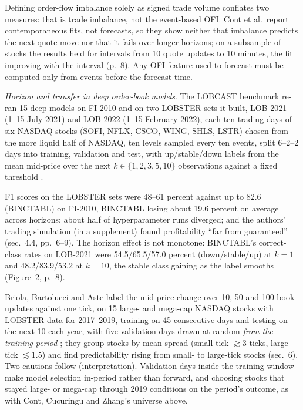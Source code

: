 \begin{qfdefinition}
 Defining order-flow imbalance solely as signed trade volume conflates two measures: that is trade imbalance, not the event-based OFI. Cont et al.\ report contemporaneous fits, not forecasts, so they show neither that imbalance predicts the next quote move nor that it fails over longer horizons; on a subsample of stocks the results held for intervals from 10 quote updates to 10 minutes, the fit improving with the interval (p.~8). Any OFI feature used to forecast must be computed only from events before the forecast time.

\emph{Horizon and transfer in deep order-book models}. The LOBCAST benchmark re-ran 15 deep models on FI-2010 and on two LOBSTER sets it built, LOB-2021 (1--15 July 2021) and LOB-2022 (1--15 February 2022), each ten trading days of six NASDAQ stocks (SOFI, NFLX, CSCO, WING, SHLS, LSTR) chosen from the more liquid half of NASDAQ, ten levels sampled every ten events, split 6--2--2 days into training, validation and test, with up/stable/down labels from the mean mid-price over the next $k\in\{1,2,3,5,10\}$ observations against a fixed threshold \citep[arXiv v2, secs.~3--4.1, pp.~3--5]{w2-lobcast}.

F1 scores on the LOBSTER sets were 48--61 percent against up to 82.6 (BINCTABL) on FI-2010, BINCTABL losing about 19.6 percent on average across horizons; about half of hyperparameter runs diverged; and the authors' trading simulation (in a supplement) found profitability ``far from guaranteed'' (sec.~4.4, pp.~6--9). The horizon effect is not monotone: BINCTABL's correct-class rates on LOB-2021 were 54.5/65.5/57.0 percent (down/stable/up) at $k=1$ and 48.2/83.9/53.2 at $k=10$, the stable class gaining as the label smooths (Figure~2, p.~8).

Briola, Bartolucci and Aste label the mid-price change over 10, 50 and 100 book updates against one tick, on 15 large- and mega-cap NASDAQ stocks with LOBSTER data for 2017--2019, training on 45 consecutive days and testing on the next 10 each year, with five validation days drawn at random \emph{from the training period} \citep[arXiv v4, secs.~4--5, Table~2 and eq.~(2), pp.~7--8]{w2-briola-lob-guide}; they group stocks by mean spread (small tick $\gtrsim3$ ticks, large tick $\lesssim1.5$) and find predictability rising from small- to large-tick stocks (sec.~6). Two cautions follow (interpretation). Validation days inside the training window make model selection in-period rather than forward, and choosing stocks that stayed large- or mega-cap through 2019 conditions on the period's outcome, as with Cont, Cucuringu and Zhang's universe above.


\end{qfdefinition}

